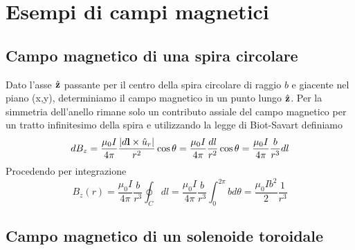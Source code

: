 \section{Esempi di campi magnetici}

\subsection{Campo magnetico di una spira circolare}


Dato l'asse $\hat{\bold{z}}$ passante per il centro della spira circolare di raggio $b$ e giacente nel piano (x,y), determiniamo il campo magnetico in un punto lungo $\hat{\bold{z}}$. Per la simmetria dell'anello rimane solo un contributo assiale del campo magnetico per un tratto infinitesimo della spira e utilizzando la legge di Biot-Savart definiamo 
\begin{equation*}
	dB_z = \frac{\mu_0I}{4 \pi} \frac{|d\bold{l} \times \hat{u}_{r}|}{r^2}\cos\theta   = \frac{\mu_0I}{4 \pi} \frac{dl}{r^2}\cos\theta  = \frac{\mu_0I}{4 \pi} \frac{b}{r^3}dl
\end{equation*} 
Procedendo per integrazione 
\begin{equation*}
	B_z(r) = \frac{\mu_0I}{4 \pi} \frac{b}{r^3} \oint_{C}dl = \frac{\mu_0I}{4 \pi} \frac{b}{r^3} \int_{0}^{2\pi} bd\theta = \frac{\mu_0Ib^2}{2} \frac{1}{r^3}
\end{equation*}


\subsection{Campo magnetico di un solenoide toroidale}


